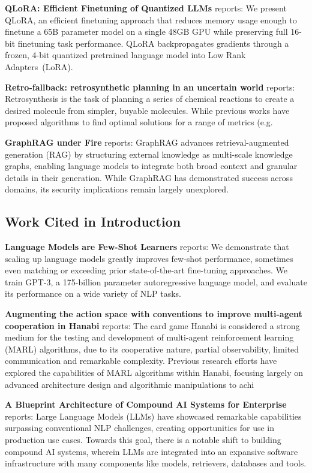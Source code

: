 \documentclass[10pt,twocolumn,letterpaper]{article}
\begin{document}
\textbf{QLoRA: Efficient Finetuning of Quantized LLMs} \cite{crossref_10_48550_arxiv_2305_14314} reports: We present QLoRA, an efficient finetuning approach that reduces memory usage enough to finetune a 65B parameter model on a single 48GB GPU while preserving full 16-bit finetuning task performance. QLoRA backpropagates gradients through a frozen, 4-bit quantized pretrained language model into Low Rank Adapters~(LoRA).

\textbf{Retro-fallback: retrosynthetic planning in an uncertain world} \cite{arxiv_2310_09270} reports: Retrosynthesis is the task of planning a series of chemical reactions to create a desired molecule from simpler, buyable molecules. While previous works have proposed algorithms to find optimal solutions for a range of metrics (e.g.

\textbf{GraphRAG under Fire} \cite{arxiv_2501_14050} reports: GraphRAG advances retrieval-augmented generation (RAG) by structuring external knowledge as multi-scale knowledge graphs, enabling language models to integrate both broad context and granular details in their generation. While GraphRAG has demonstrated success across domains, its security implications remain largely unexplored.


\subsection{Work Cited in Introduction}


\textbf{Language Models are Few-Shot Learners} \cite{arxiv_2005_14165} reports: We demonstrate that scaling up language models greatly improves few-shot performance, sometimes even matching or exceeding prior state-of-the-art fine-tuning approaches. We train GPT-3, a 175-billion parameter autoregressive language model, and evaluate its performance on a wide variety of NLP tasks.

\textbf{Augmenting the action space with conventions to improve multi-agent cooperation in Hanabi} \cite{arxiv_2412_06333} reports: The card game Hanabi is considered a strong medium for the testing and development of multi-agent reinforcement learning (MARL) algorithms, due to its cooperative nature, partial observability, limited communication and remarkable complexity. Previous research efforts have explored the capabilities of MARL algorithms within Hanabi, focusing largely on advanced architecture design and algorithmic manipulations to achi

\textbf{A Blueprint Architecture of Compound AI Systems for Enterprise} \cite{arxiv_2406_00584} reports: Large Language Models (LLMs) have showcased remarkable capabilities surpassing conventional NLP challenges, creating opportunities for use in production use cases. Towards this goal, there is a notable shift to building compound AI systems, wherein LLMs are integrated into an expansive software infrastructure with many components like models, retrievers, databases and tools.
\end{document}
